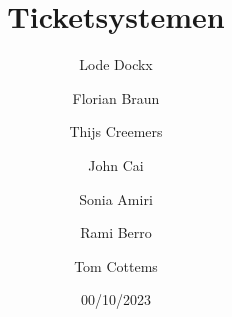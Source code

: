 \documentclass[12pt, a4paper]{article}
\title{Ticketsystemen}
\subtitle{}
\author{Lode Dockx \and Florian Braun \and Thijs Creemers \and John Cai \and Sonia Amiri \and Rami Berro \and Tom Cottems}
\date{00/10/2023}
\begin{document}
	\begin{titlepage}
		\maketitle
	\end{titlepage}

    
    
\end{document}
